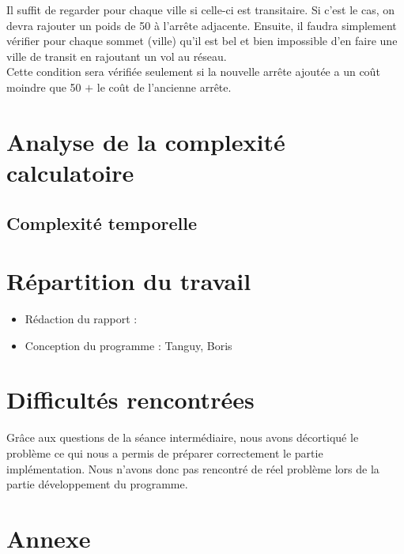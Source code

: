 \documentclass[11pt]{article}
\begin{document}
Il suffit de regarder pour chaque ville si celle-ci est transitaire. Si c'est le cas, on devra rajouter un poids de 50 à l'arrête adjacente. Ensuite, il faudra simplement vérifier pour chaque sommet (ville) qu'il est bel et bien impossible d'en faire une ville de transit en rajoutant un vol au réseau. \\
Cette condition sera vérifiée seulement si la nouvelle arrête ajoutée a un coût moindre que 50 $+$ le coût de l'ancienne arrête. 


\section{Analyse de la complexité calculatoire}
\subsection{Complexité temporelle}

\section{Répartition du travail}
\begin{itemize}
\item Rédaction du rapport : 
\item Conception du programme : Tanguy, Boris
\end{itemize}

\section{Difficultés rencontrées}
Grâce aux questions de la séance intermédiaire, nous avons décortiqué le problème ce qui nous a permis de préparer correctement le partie implémentation. Nous n'avons donc pas rencontré de réel problème lors de la partie développement du programme.
\newpage

\section{Annexe}
\begin{center}
\end{center}
\end{document}
